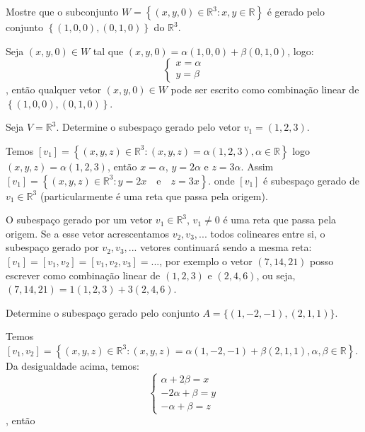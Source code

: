 \begin{ex}
Mostre que o subconjunto $W=\left\lbrace (x,y,0)\in \mathbb{R}^{3}: x,y\in \mathbb{R}\right\rbrace $ é gerado pelo conjunto $\left\lbrace (1,0,0), (0,1,0) \right\rbrace $ do $\mathbb{R}^{3}$.
\end{ex}

Seja $(x,y,0)\in W$ tal que $(x,y,0)=\alpha (1,0,0)+\beta(0,1,0)$, logo:
\begin{equation*}
\begin{cases}
x=\alpha   \\
y=\beta 
\end{cases}
\end{equation*}, então qualquer vetor $(x,y,0)\in W$ pode ser escrito como combinação linear de $\left\lbrace (1,0,0), (0,1,0) \right\rbrace $.
\begin{ex}
	Seja $V=\mathbb{R}^{3}$. Determine o subespaço gerado pelo vetor $v_{1}=(1,2,3)$.
\end{ex}
Temos $[v_{1}]=\left\lbrace (x,y,z)\in \mathbb{R}^{3}: (x,y,z)=\alpha (1,2,3), \alpha \in \mathbb{R} \right\rbrace $ logo $(x,y,z)=\alpha (1,2,3)$, então $x=\alpha$, $y=2\alpha$ e $z=3\alpha$. Assim $[v_{1}]=\left\lbrace (x,y,z)\in \mathbb{R}^{3}: y=2x \quad \text{e}\quad z=3x \right\rbrace $. onde $[v_{1}]$ é subespaço gerado de $v_{1}\in \mathbb{R}^{3}$ (particularmente é uma reta que passa pela origem).

O subespaço gerado por um vetor $v_{1}\in \mathbb{R}^{3}$, $v_{1}\neq 0$ é uma reta que passa pela origem. Se a esse vetor acrescentamos $v_{2},v_{3},...$ todos colineares entre si, o subespaço gerado por $v_{2}, v_{3},...$ vetores continuará sendo a mesma reta: $[v_{1}]=[v_{1},v_{2}]=[v_{1},v_{2},v_{3}]=...$, por exemplo o vetor $(7,14,21)$ posso escrever como combinação linear de $(1,2,3)$ e $(2,4,6)$, ou seja, $(7,14,21)=1(1,2,3)+3(2,4,6)$.

\begin{ex}
	Determine o subespaço gerado pelo conjunto $A=\{(1,-2,-1),(2,1,1)\}$.
\end{ex}
Temos $[v_{1},v_{2}]=\left\lbrace (x,y,z)\in\mathbb{R}^{3} : (x,y,z)=\alpha (1,-2,-1)+\beta (2,1,1), \alpha, \beta \in \mathbb{R}\right\rbrace $. Da desigualdade acima, temos:
\begin{equation*}
\begin{cases}
\alpha+2\beta=x   \\
-2\alpha+\beta=y \\
-\alpha+\beta=z 
\end{cases}
\end{equation*}, então 

